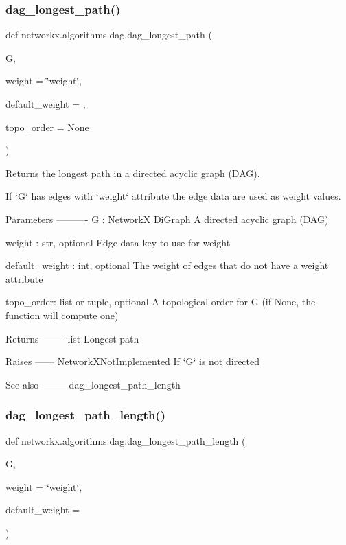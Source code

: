 \subsubsection{\texorpdfstring{dag\+\_\+longest\+\_\+path()}{dag\_longest\_path()}}
{\footnotesize\ttfamily def networkx.\+algorithms.\+dag.\+dag\+\_\+longest\+\_\+path (\begin{DoxyParamCaption}\item[{}]{G,  }\item[{}]{weight = {\ttfamily \char`\"{}weight\char`\"{}},  }\item[{}]{default\+\_\+weight = {},  }\item[{}]{topo\+\_\+order = {\ttfamily None} }\end{DoxyParamCaption})}

\begin{DoxyVerb}Returns the longest path in a directed acyclic graph (DAG).

If `G` has edges with `weight` attribute the edge data are used as
weight values.

Parameters
----------
G : NetworkX DiGraph
    A directed acyclic graph (DAG)

weight : str, optional
    Edge data key to use for weight

default_weight : int, optional
    The weight of edges that do not have a weight attribute

topo_order: list or tuple, optional
    A topological order for G (if None, the function will compute one)

Returns
-------
list
    Longest path

Raises
------
NetworkXNotImplemented
    If `G` is not directed

See also
--------
dag_longest_path_length\end{DoxyVerb}
 \mbox{\label{namespacenetworkx_1_1algorithms_1_1dag_aa5cb4d4b25d9d700fe878ddf4044ed72}} 
\subsubsection{\texorpdfstring{dag\+\_\+longest\+\_\+path\+\_\+length()}{dag\_longest\_path\_length()}}
{\footnotesize\ttfamily def networkx.\+algorithms.\+dag.\+dag\+\_\+longest\+\_\+path\+\_\+length (\begin{DoxyParamCaption}\item[{}]{G,  }\item[{}]{weight = {\ttfamily \char`\"{}weight\char`\"{}},  }\item[{}]{default\+\_\+weight = {} }\end{DoxyParamCaption})}

